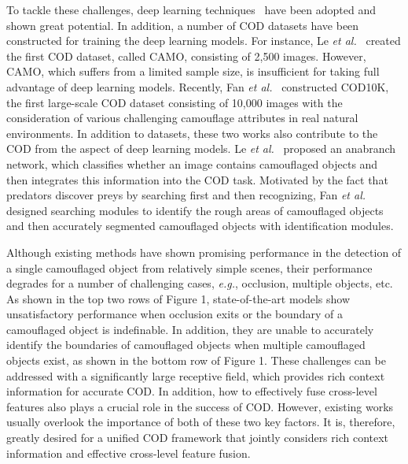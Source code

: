 \documentclass[lettersize,journal]{IEEEtran}
\newcommand{\figref}[1]{Figure 1}%
\newcommand{\figref}[1]{Fig.~\ref{#1}}%
\def\eg{\emph{e.g.}}
\def\etal{{\em et al.}}
\def\etal{{\em et al.}}
\begin{document}
To tackle these challenges, deep learning techniques~\cite{cubenet} have been adopted and shown great potential.
In addition, a number of COD datasets have been constructed for training the deep learning models.
For instance, Le \etal~\cite{anet} created the first COD dataset, called CAMO, consisting of 2,500 images.
However, CAMO, which suffers from a limited sample size, is insufficient for taking full advantage of deep learning models.
Recently, Fan \etal~\cite{sinet} constructed COD10K, the first large-scale COD dataset consisting of 10,000 images with the consideration of various challenging camouflage attributes in real natural environments.
In addition to datasets, these two works also contribute to the COD from the aspect of deep learning models. Le \etal~\cite{anet} proposed an anabranch network, which classifies whether an image contains camouflaged objects and then integrates this information into the COD task. Motivated by the fact that predators discover preys by searching first and then recognizing, Fan \etal~\cite{sinet} designed searching modules to identify the rough areas of camouflaged objects and then accurately segmented camouflaged objects with identification modules.

Although existing methods have shown promising performance in the detection of a single camouflaged object from relatively simple scenes, their performance degrades for a number of challenging cases, \eg, {occlusion, multiple objects}, etc.
As shown in the top two rows of \figref{fig:examples}, state-of-the-art models show unsatisfactory performance when occlusion exits or the boundary of a camouflaged object is indefinable. In addition, they are unable to accurately identify the boundaries of camouflaged objects when multiple camouflaged objects exist, as shown in the bottom row of \figref{fig:examples}.
These challenges can be addressed with a significantly large receptive field, which provides rich context information for accurate COD.
In addition, how to effectively fuse cross-level features also plays a crucial role in the success of COD.
However, existing works usually overlook the importance of both of these two key factors. It is, therefore, greatly desired for a unified COD framework that jointly considers rich context information and effective cross-level feature fusion.
\end{document}
